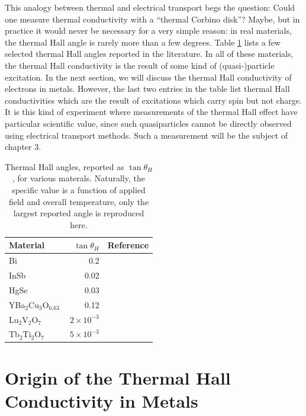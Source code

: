 \documentclass{thesis-umich}
\begin{document}
This analogy between thermal and electrical transport begs the question: Could
one measure thermal conductivity with a ``thermal Corbino disk''? Maybe, but in
practice it would never be necessary for a very simple reason: in real
materials, the thermal Hall angle is rarely more than a few degrees. Table
\ref{hallAngleTable} lists a few selected thermal Hall angles reported in the
literature. In all of these materials, the thermal Hall conductivity is the
result of some kind of (quasi-)particle excitation. In the next section, we
will discuss the thermal Hall conductivity of electrons in metals. However, the
last two entries in the table list thermal Hall conductivities which are the
result of excitations which carry spin but not charge. It is this kind of
experiment where measurements of the thermal Hall effect have particular
scientific value, since such quasiparticles cannot be directly observed using
electrical transport methods. Such a measurement will be the subject of chapter
3.

\begin{table}
\centering
\label{hallAngleTable}
\begin{tabular}{l|r|c}
\hline
Material & $\tan \theta_H$ & Reference \\
\hline
Bi & 0.2 & \cite{Kobayashi2012}  \\
InSb & 0.02 & \cite{Mette1963} \\
HgSe & 0.03 & \cite{Whitsett1961} \\
YBa$_2$Cu$_3$O$_{6.63}$ & 0.12 & \cite{Krishana1999} \\
Lu$_2$V$_2$O$_7$ & $2 \times 10^{-3}$ & \cite{Onose2010} \\
Tb$_2$Ti$_2$O$_7$ & $~5 \times 10^{-3}$ & \cite{Hirschberger2015} \\
\hline
\end{tabular}
\caption[Example thermal Hall angles]{Thermal Hall angles, reported as $\tan \theta_H$, for various materals. Naturally, the specific value is a function of applied field and overall temperature, only the largest reported angle is reproduced here.}
\end{table}
\section{Origin of the Thermal Hall Conductivity in Metals}
\end{document}
